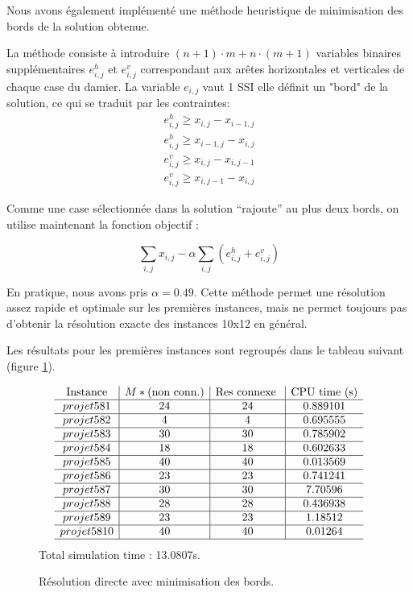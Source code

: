 \documentclass[12pt,a4paper]{article}
\begin{document}
Nous avons également implémenté une méthode heuristique de minimisation des bords de la solution obtenue.

La méthode consiste à introduire $(n+1) \cdot m + n\cdot (m+1) $ variables binaires supplémentaires $e^h_{i,j}$ et $e^v_{i,j}$ correspondant aux arêtes horizontales et verticales de chaque case du damier. La variable $e_{i,j}$ vaut 1 SSI elle définit un "bord" de la solution, ce qui se traduit par les contraintes: 
\begin{align}
e^h_{i,j}\geq x_{i,j} - x_{i-1,j} \\
e^h_{i,j}\geq x_{i-1,j} - x_{i,j} \\
e^v_{i,j}\geq x_{i,j} - x_{i,j-1} \\
e^v_{i,j}\geq x_{i,j-1} - x_{i,j}
\end{align}

Comme une case sélectionnée dans la solution ``rajoute'' au plus deux bords, on utilise maintenant la fonction objectif :

$$ \sum_{i,j} x_{i,j} - \alpha \sum_{i,j} \left( e^h_{i,j} + e^v_{i,j} \right)$$

En pratique, nous avons pris $\alpha= 0.49$.
Cette méthode permet une résolution assez rapide et optimale sur les premières instances, mais ne permet toujours pas d'obtenir la résolution exacte des instances 10x12 en général.

Les résultats pour les premières instances sont regroupés dans le tableau suivant (figure \ref{tabMinEdges}).


\begin{figure}[H]
\centering

\[
\begin{array}{c|c|c|c}
\text{Instance} & M* \text{(non conn.)} & \text{Res connexe }& \text{CPU time (s)} \\\hline
projet 5 8 1 &24 & 24 & 0.889101\\ \hline
projet 5 8 2 &4 & 4 & 0.695555\\ \hline
projet 5 8 3 &30 & 30 & 0.785902\\ \hline
projet 5 8 4 &18 & 18 & 0.602633\\ \hline
projet 5 8 5 &40 & 40 & 0.013569\\ \hline
projet 5 8 6 &23 & 23 & 0.741241\\ \hline
projet 5 8 7 &30 & 30 & 7.70596\\ \hline
projet 5 8 8 &28 & 28 & 0.436938\\ \hline
projet 5 8 9 &23 & 23 & 1.18512\\ \hline
projet 5 8 10 &40 & 40 & 0.01264\\ \hline
\end{array}\]
Total simulation time : 13.0807s.

\caption{Résolution directe avec minimisation des bords.}
\label{tabMinEdges}

\end{figure}
\end{document}
